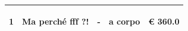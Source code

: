 \documentclass[a4paper]{article}
\begin{document}
\begin{tabular}{ | L{10mm} |  L{86mm} | L{12mm} | L{12mm} | L{16mm} | }
                              \vspace{2.5mm}
                              \begin{spacing}{0}
                           1
                              \end{spacing} &
                              \vspace{2.5mm}
                              \begin{spacing}{0}
                           Ma perch\'e fff ?!
                              \end{spacing} &
                              \vspace{2.5mm}
                              \begin{spacing}{0}
                           -
                              \end{spacing} &
                              \vspace{2.5mm}
                              \begin{spacing}{0}
                           a corpo
                              \end{spacing} &
                              \vspace{2.5mm}
                              \begin{spacing}{0}
                                \euro\hfill 
                            360.0
                              \end{spacing} \\
                              \hline
            

\end{tabular}
\end{document}
